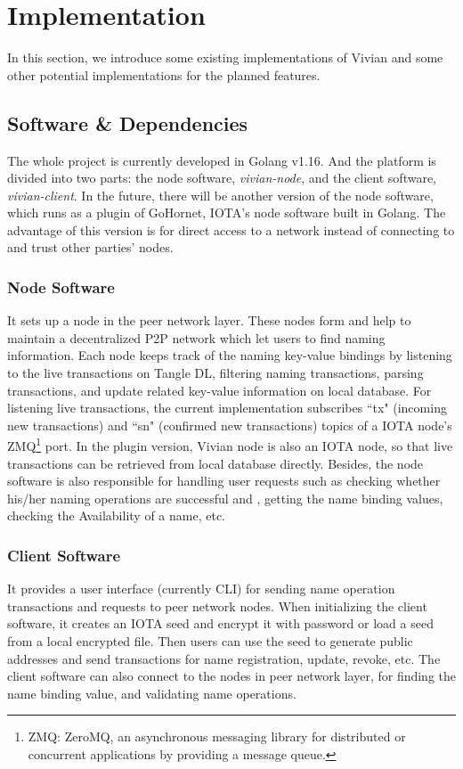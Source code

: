 \section{Implementation}
\label{sec:implementation}

In this section, we introduce some existing implementations of Vivian and some other potential implementations for the planned features.

\subsection{Software \& Dependencies}

The whole project is currently developed in Golang v1.16.
And the platform is divided into two parts: the node software, \textit{vivian-node}, and the client software, \textit{vivian-client}.
In the future, there will be another version of the node software, which runs as a plugin of GoHornet, IOTA's node software built in Golang.
The advantage of this version is for direct access to a network instead of connecting to and trust other parties' nodes.

\subsubsection{Node Software} It sets up a node in the peer network layer. These nodes form and help to maintain a decentralized P2P network which let users to find naming information.
Each node keeps track of the naming key-value bindings by listening to the live transactions on Tangle DL, filtering naming transactions, parsing transactions, and update related key-value information on local database.
For listening live transactions, the current implementation subscribes ``tx" (incoming new transactions) and ``sn" (confirmed new transactions) topics of a IOTA node's ZMQ\footnote{ZMQ: ZeroMQ, an asynchronous messaging library for distributed or concurrent applications by providing a message queue.} port.
In the plugin version, Vivian node is also an IOTA node, so that live transactions can be retrieved from local database directly.
Besides, the node software is also responsible for handling user requests such as checking whether his/her naming operations are successful and , getting the name binding values, checking the Availability of a name, etc.

\subsubsection{Client Software} It provides a user interface (currently CLI) for sending name operation transactions and requests to peer network nodes.
When initializing the client software, it creates an IOTA seed and encrypt it with password or load a seed from a local encrypted file.
Then users can use the seed to generate public addresses and send transactions for name registration, update, revoke, etc.
The client software can also connect to the nodes in peer network layer, for finding the name binding value, and validating name operations.


